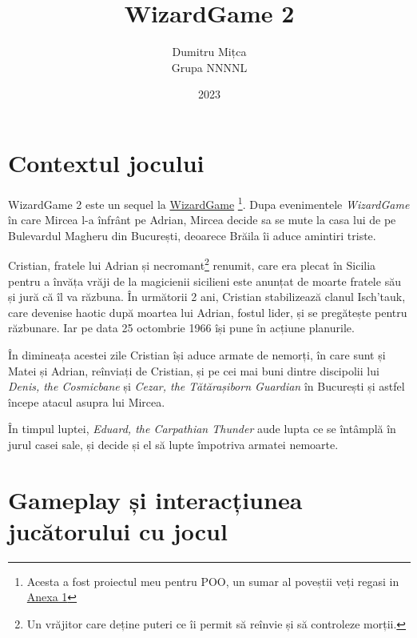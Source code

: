 \documentclass{article}
\title{\textbf{WizardGame 2}}
\author{
    Dumitru Mițca\\
    Grupa NNNNL
}
\date{2023}
\begin{document}
    \maketitle

    \hypersetup{linkbordercolor=1 1 1}
    \renewcommand*\contentsname{Cuprins}
    \tableofcontents
    \hypersetup{linkbordercolor=1 0 0}


    \newpage

    \section{Contextul jocului}
    WizardGame 2 este un sequel la \href{https://github.com/RealKC/WizardGame}{WizardGame}
    \footnote{Acesta a fost proiectul meu pentru POO, un sumar al poveștii veți
    regasi in \href{sec:anexa1}{Anexa 1}}.
    Dupa evenimentele \emph{WizardGame} în care Mircea l-a înfrânt pe Adrian, Mircea decide sa se
    mute la casa lui de pe Bulevardul Magheru din București, deoarece Brăila îi aduce amintiri
    triste.

    Cristian, fratele lui Adrian și necromant\footnote{Un vrăjitor care deține puteri ce
    îi permit să reînvie și să controleze morții.} renumit, care era plecat în Sicilia
    pentru a învăța vrăji de la magicienii sicilieni este anunțat de moarte fratele său
    și jură că îl va răzbuna. În următorii 2 ani, Cristian stabilizează clanul Isch'tauk,
    care devenise haotic după moartea lui Adrian, fostul lider, și se pregătește pentru
    răzbunare. Iar pe data 25 octombrie 1966 își pune în acțiune planurile.

    În dimineața acestei zile Cristian își aduce armate de nemorți, în care sunt și Matei
    și Adrian, reînviați de Cristian, și pe cei mai buni dintre discipolii lui \emph{Denis,
    the Cosmicbane} și \emph{Cezar, the Tătărașiborn Guardian} în București și astfel
    începe atacul asupra lui Mircea.

    În timpul luptei, \emph{Eduard, the Carpathian Thunder} aude lupta ce se întâmplă în jurul
    casei sale, și decide și el să lupte împotriva armatei nemoarte.

    \section{Gameplay și interacțiunea jucătorului cu jocul}
\end{document}
